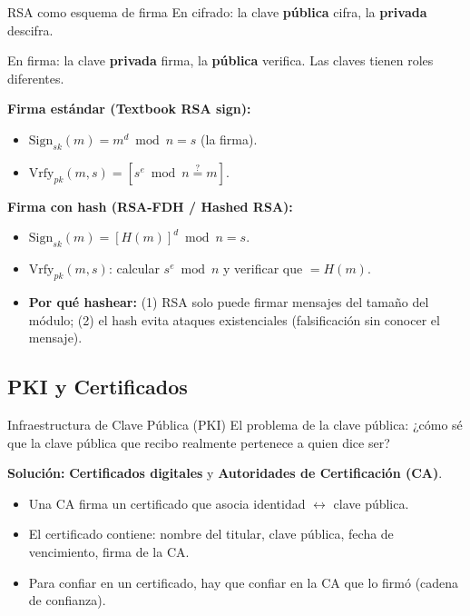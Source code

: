 \documentclass[11pt,a4paper]{article}
\begin{document}
\begin{teoriabox}{RSA como esquema de firma}
En cifrado: la clave \textbf{pública} cifra, la \textbf{privada} descifra.

En firma: la clave \textbf{privada} firma, la \textbf{pública} verifica. Las claves tienen roles diferentes.

\medskip
\textbf{Firma estándar (Textbook RSA sign):}
\begin{itemize}
  \item $\text{Sign}_{sk}(m) = m^d \bmod n = s$ (la firma).
  \item $\text{Vrfy}_{pk}(m, s) = [s^e \bmod n \stackrel{?}{=} m]$.
\end{itemize}

\textbf{Firma con hash (RSA-FDH / Hashed RSA):}
\begin{itemize}
  \item $\text{Sign}_{sk}(m) = [H(m)]^d \bmod n = s$.
  \item $\text{Vrfy}_{pk}(m, s)$: calcular $s^e \bmod n$ y verificar que $= H(m)$.
  \item \textbf{Por qué hashear:} (1) RSA solo puede firmar mensajes del tamaño del módulo; (2) el hash evita ataques existenciales (falsificación sin conocer el mensaje).
\end{itemize}
\end{teoriabox}

\subsection{PKI y Certificados}

\begin{teoriabox}{Infraestructura de Clave Pública (PKI)}
El problema de la clave pública: ¿cómo sé que la clave pública que recibo realmente pertenece a quien dice ser?

\textbf{Solución:} \textbf{Certificados digitales} y \textbf{Autoridades de Certificación (CA)}.
\begin{itemize}
  \item Una CA firma un certificado que asocia identidad $\leftrightarrow$ clave pública.
  \item El certificado contiene: nombre del titular, clave pública, fecha de vencimiento, firma de la CA.
  \item Para confiar en un certificado, hay que confiar en la CA que lo firmó (cadena de confianza).
\end{itemize}
\end{teoriabox}
\end{document}
